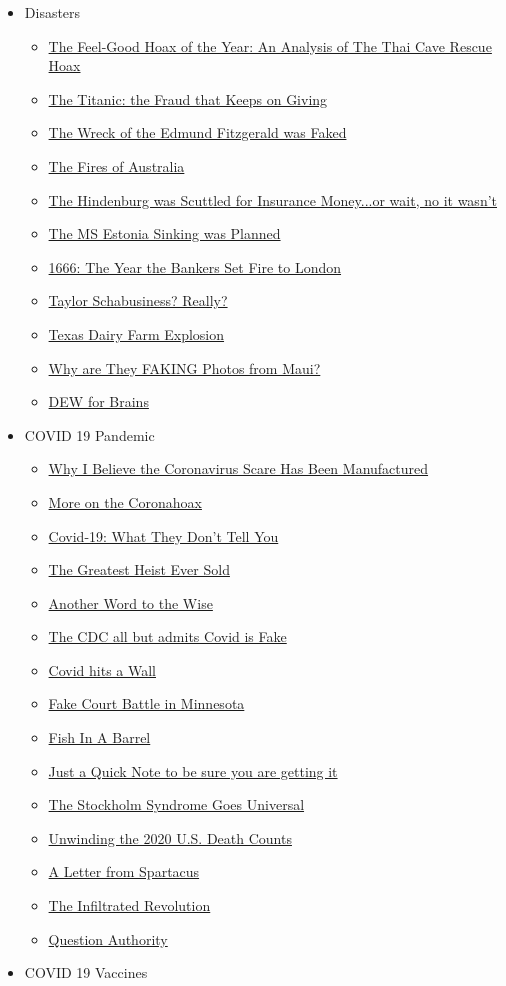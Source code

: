 \documentclass{article}
\newcommand{\insertmydocument}[2]{ %
  \item \href{http://www.mileswmathis.com/#2}{#1}
}
\begin{document}
\begin{itemize}
\begin{itemize}
    \item Disasters
    \begin{itemize}

      \insertmydocument{The Feel-Good Hoax of the Year: An Analysis of The Thai Cave Rescue Hoax}{thai.pdf}
      \insertmydocument{The Titanic: the Fraud that Keeps on Giving}{titan.pdf}
      \insertmydocument{The Wreck of the Edmund Fitzgerald was Faked}{lightfoot.pdf}
      \insertmydocument{The Fires of Australia}{fires.pdf}
      \insertmydocument{The Hindenburg was Scuttled for Insurance Money...or wait, no it wasn't}{hind.pdf}
      \insertmydocument{The MS Estonia Sinking was Planned}{eston.pdf}
      \insertmydocument{1666: The Year the Bankers Set Fire to London}{1666.pdf}
      \insertmydocument{Taylor Schabusiness? Really?}{coronad.pdf}
      \insertmydocument{Texas Dairy Farm Explosion}{barnfire.pdf}
      \insertmydocument{Why are They FAKING Photos from Maui?}{maui.pdf}
      \insertmydocument{DEW for Brains}{dew.pdf}
    \end{itemize}

    \item COVID 19 Pandemic
    \begin{itemize}

      \insertmydocument{Why I Believe the Coronavirus Scare Has Been Manufactured}{corona.pdf}
      \insertmydocument{More on the Coronahoax}{cor2.pdf}
      \insertmydocument{Covid-19: What They Don’t Tell You}{covid.pdf}
      \insertmydocument{The Greatest Heist Ever Sold}{heist.pdf}
      \insertmydocument{Another Word to the Wise}{wise.pdf}
      \insertmydocument{The CDC all but admits Covid is Fake}{logic.pdf}
      \insertmydocument{Covid hits a Wall}{covid3.pdf}
      \insertmydocument{Fake Court Battle in Minnesota}{grath.pdf}
      \insertmydocument{Fish In A Barrel}{barrel.pdf}
      \insertmydocument{Just a Quick Note to be sure you are getting it}{orthanc.pdf}
      \insertmydocument{The Stockholm Syndrome Goes Universal}{stockholm.pdf}
      \insertmydocument{Unwinding the 2020 U.S. Death Counts}{2020D.pdf}
      \insertmydocument{A Letter from Spartacus}{spart.pdf}
      \insertmydocument{The Infiltrated Revolution}{rock.pdf}
      \insertmydocument{Question Authority}{bug.pdf}
    \end{itemize}

    \item COVID 19 Vaccines
    \begin{itemize}


\end{itemize}
\end{itemize}
\end{itemize}
\end{document}
